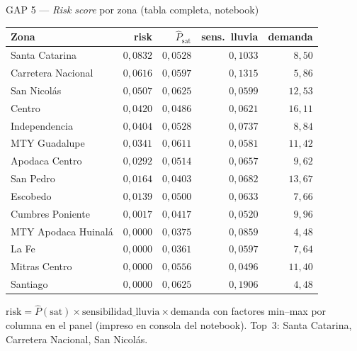 \begin{frame}{GAP 5 — \textit{Risk score} por zona (tabla completa, notebook)}
  \begingroup
  \centering
  \tiny
  \renewcommand{\arraystretch}{1.02}
  \begin{tabular}{@{}lrrrr@{}}
    \toprule
    \textbf{Zona} & \textbf{risk} & $\hat P_{\text{sat}}$ & sens.\ lluvia & demanda \\
    \midrule
    Santa Catarina      & $0{,}0832$ & $0{,}0528$ & $0{,}1033$ & $8{,}50$ \\
    Carretera Nacional  & $0{,}0616$ & $0{,}0597$ & $0{,}1315$ & $5{,}86$ \\
    San Nicolás         & $0{,}0507$ & $0{,}0625$ & $0{,}0599$ & $12{,}53$ \\
    Centro              & $0{,}0420$ & $0{,}0486$ & $0{,}0621$ & $16{,}11$ \\
    Independencia       & $0{,}0404$ & $0{,}0528$ & $0{,}0737$ & $8{,}84$ \\
    MTY Guadalupe       & $0{,}0341$ & $0{,}0611$ & $0{,}0581$ & $11{,}42$ \\
    Apodaca Centro      & $0{,}0292$ & $0{,}0514$ & $0{,}0657$ & $9{,}62$ \\
    San Pedro           & $0{,}0164$ & $0{,}0403$ & $0{,}0682$ & $13{,}67$ \\
    Escobedo            & $0{,}0139$ & $0{,}0500$ & $0{,}0633$ & $7{,}66$ \\
    Cumbres Poniente    & $0{,}0017$ & $0{,}0417$ & $0{,}0520$ & $9{,}96$ \\
    MTY Apodaca Huinalá & $0{,}0000$ & $0{,}0375$ & $0{,}0859$ & $4{,}48$ \\
    La Fe               & $0{,}0000$ & $0{,}0361$ & $0{,}0597$ & $7{,}64$ \\
    Mitras Centro       & $0{,}0000$ & $0{,}0556$ & $0{,}0496$ & $11{,}40$ \\
    Santiago            & $0{,}0000$ & $0{,}0625$ & $0{,}1906$ & $4{,}48$ \\
    \bottomrule
  \end{tabular}
  \par
  \endgroup

  \begin{piegrafica}
  $\text{risk} = \hat P(\text{sat}) \times \text{sensibilidad\_lluvia} \times \text{demanda}$ con factores min--max por columna en el panel (impreso en consola del notebook). Top~3: Santa Catarina, Carretera Nacional, San Nicolás.
  \end{piegrafica}
\end{frame}

